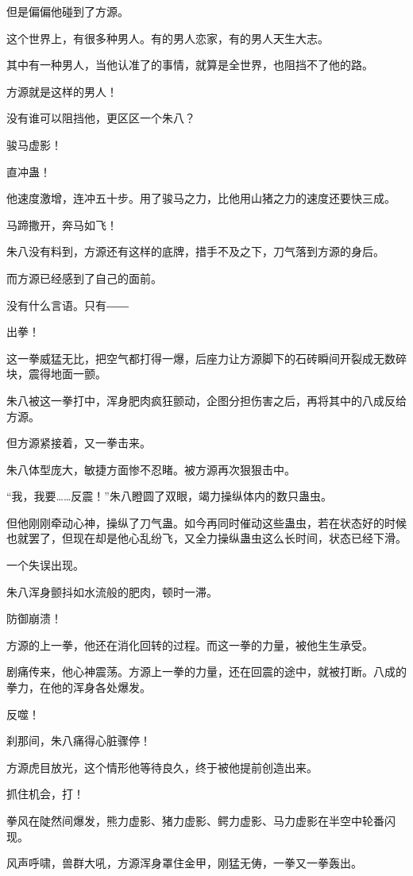 \begin{this_body}
但是偏偏他碰到了方源。

这个世界上，有很多种男人。有的男人恋家，有的男人天生大志。

其中有一种男人，当他认准了的事情，就算是全世界，也阻挡不了他的路。

方源就是这样的男人！

没有谁可以阻挡他，更区区一个朱八？

骏马虚影！

直冲蛊！

他速度激增，连冲五十步。用了骏马之力，比他用山猪之力的速度还要快三成。

马蹄撒开，奔马如飞！

朱八没有料到，方源还有这样的底牌，措手不及之下，刀气落到方源的身后。

而方源已经感到了自己的面前。

没有什么言语。只有――

出拳！

这一拳威猛无比，把空气都打得一爆，后座力让方源脚下的石砖瞬间开裂成无数碎块，震得地面一颤。

朱八被这一拳打中，浑身肥肉疯狂颤动，企图分担伤害之后，再将其中的八成反给方源。

但方源紧接着，又一拳击来。

朱八体型庞大，敏捷方面惨不忍睹。被方源再次狠狠击中。

“我，我要……反震！”朱八瞪圆了双眼，竭力操纵体内的数只蛊虫。

但他刚刚牵动心神，操纵了刀气蛊。如今再同时催动这些蛊虫，若在状态好的时候也就罢了，但现在却是他心乱纷飞，又全力操纵蛊虫这么长时间，状态已经下滑。

一个失误出现。

朱八浑身颤抖如水流般的肥肉，顿时一滞。

防御崩溃！

方源的上一拳，他还在消化回转的过程。而这一拳的力量，被他生生承受。

剧痛传来，他心神震荡。方源上一拳的力量，还在回震的途中，就被打断。八成的拳力，在他的浑身各处爆发。

反噬！

刹那间，朱八痛得心脏骤停！

方源虎目放光，这个情形他等待良久，终于被他提前创造出来。

抓住机会，打！

拳风在陡然间爆发，熊力虚影、猪力虚影、鳄力虚影、马力虚影在半空中轮番闪现。

风声呼啸，兽群大吼，方源浑身罩住金甲，刚猛无俦，一拳又一拳轰出。


\end{this_body}

